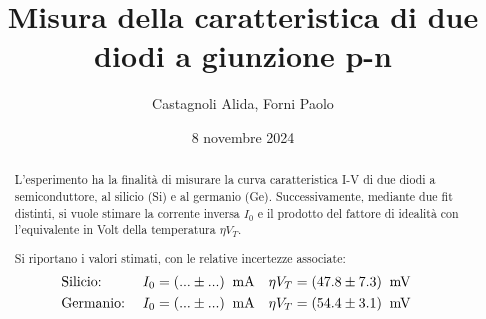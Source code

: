 \documentclass[11pt]{article}
\begin{document}

\title{\textbf{Misura della caratteristica di due diodi a giunzione p-n}}
\author{Castagnoli Alida, Forni Paolo}
\date{8 novembre 2024}
\maketitle


\vspace{-23pt}  %

\begin{abstract}
    L'esperimento ha la finalità di misurare la curva caratteristica \mbox{I-V} di due diodi a semiconduttore, al silicio (Si) e al germanio (Ge).
    Successivamente, mediante due fit distinti, si vuole stimare la corrente inversa $I_{0}$ e il prodotto del fattore di idealità con l'equivalente in Volt della temperatura $\eta V_{T}$.

    \noindent Si riportano i valori stimati, con le relative incertezze associate:
    \vspace{-1pt}
    \begin{align*}
        &\textnormal{Silicio:} \;
        &I_{0} &= (... \pm ...) \;\;\textnormal{mA} &
        \eta V_{T} &= (47.8 \pm 7.3)\;\;\textnormal{mV} & \\
        &\textnormal{Germanio:} \;
        &I_{0} &= (... \pm ...) \;\;\textnormal{mA} &
        \eta V_{T} &= (54.4 \pm 3.1)\;\;\textnormal{mV} &
    \end{align*}

\end{abstract}




\newpage
\appendix


\end{document}
